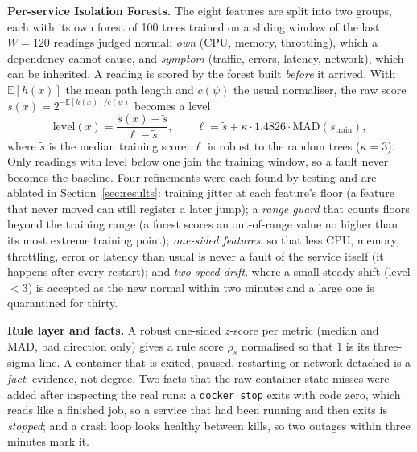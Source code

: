 \documentclass[journal]{IEEEtran}
\newcommand{\E}{\mathbb{E}}
\begin{document}
\textbf{Per-service Isolation Forests.} The eight features are split into two groups, each with its own forest of 100 trees trained
on a sliding window of the last $W{=}120$ readings judged normal: \emph{own} (CPU, memory, throttling), which a dependency cannot cause,
and \emph{symptom} (traffic, errors, latency, network), which can be inherited. A reading is scored by the forest built \emph{before} it
arrived. With $\E[h(x)]$ the mean path length and $c(\psi)$ the usual normaliser, the raw score
$s(x)=2^{-\E[h(x)]/c(\psi)}$ becomes a level
\begin{equation}
\mathrm{level}(x)=\frac{s(x)-\tilde s}{\ell-\tilde s},\qquad \ell=\tilde s+\kappa\cdot1.4826\cdot\mathrm{MAD}(s_{\mathrm{train}}),
\label{eq:level}
\end{equation}
where $\tilde s$ is the median training score; $\ell$ is robust to the random trees ($\kappa{=}3$). Only readings with level below one
join the training window, so a fault never becomes the baseline. Four refinements were each found by testing and are ablated in
Section~\ref{sec:results}: training jitter at each feature's floor (a feature that never moved can still register a later jump); a
\emph{range guard} that counts floors beyond the training range (a forest scores an out-of-range value no higher than its most
extreme training point); \emph{one-sided features}, so that less CPU, memory, throttling, error or latency than usual is never a
fault of the service itself (it happens after every restart); and \emph{two-speed drift}, where a small steady shift (level
$<3$) is accepted as the new normal within two minutes and a large one is quarantined for thirty.

\textbf{Rule layer and facts.} A robust one-sided $z$-score per metric (median and MAD, bad direction only) gives a rule score
$\rho_s$ normalised so that $1$ is its three-sigma line. A container that is exited, paused, restarting or network-detached is a
\emph{fact}: evidence, not degree. Two facts that the raw container state misses were added after inspecting the real runs: a
\texttt{docker stop} exits with code zero, which reads like a finished job, so a service that had been running and then exits is
\emph{stopped}; and a crash loop looks healthy between kills, so two outages within three minutes mark it.
\end{document}
